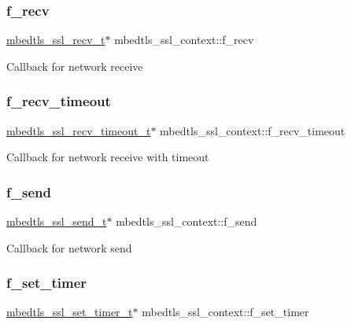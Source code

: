 \subsubsection{\texorpdfstring{f\+\_\+recv}{f\_recv}}
{\footnotesize\ttfamily \hyperlink{ssl_8h_ac06b19b96b643090c55f19b6c28b10c4}{mbedtls\+\_\+ssl\+\_\+recv\+\_\+t}$\ast$ mbedtls\+\_\+ssl\+\_\+context\+::f\+\_\+recv}

Callback for network receive \mbox{\label{structmbedtls__ssl__context_ab73e4b497e3ed88b3bebad3bada2758b}} 
\subsubsection{\texorpdfstring{f\+\_\+recv\+\_\+timeout}{f\_recv\_timeout}}
{\footnotesize\ttfamily \hyperlink{ssl_8h_a6d615ca95c8a67d7c5f9d7d256dc09e6}{mbedtls\+\_\+ssl\+\_\+recv\+\_\+timeout\+\_\+t}$\ast$ mbedtls\+\_\+ssl\+\_\+context\+::f\+\_\+recv\+\_\+timeout}

Callback for network receive with timeout \mbox{\label{structmbedtls__ssl__context_a56c031134adcd848c5fbdab961fe263d}} 
\subsubsection{\texorpdfstring{f\+\_\+send}{f\_send}}
{\footnotesize\ttfamily \hyperlink{ssl_8h_a38e2b400d361f42f85833cdc30b3916e}{mbedtls\+\_\+ssl\+\_\+send\+\_\+t}$\ast$ mbedtls\+\_\+ssl\+\_\+context\+::f\+\_\+send}

Callback for network send \mbox{\label{structmbedtls__ssl__context_a1dd74017666428c62af5e05e46f0f8f1}} 
\subsubsection{\texorpdfstring{f\+\_\+set\+\_\+timer}{f\_set\_timer}}
{\footnotesize\ttfamily \hyperlink{ssl_8h_a61c5d9ed63c50ee809eec98820d3f36c}{mbedtls\+\_\+ssl\+\_\+set\+\_\+timer\+\_\+t}$\ast$ mbedtls\+\_\+ssl\+\_\+context\+::f\+\_\+set\+\_\+timer}

